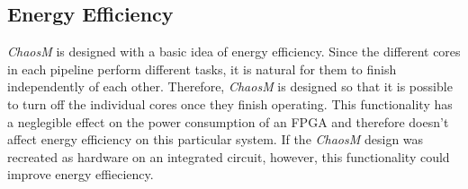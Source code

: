 \subsection{Energy Efficiency}

\textit{ChaosM} is designed with a basic idea of energy efficiency. Since the
different cores in each pipeline perform different tasks, it is natural for them
to finish independently of each other. Therefore, \textit{ChaosM} is designed so
that it is possible to turn off the individual cores once they finish operating.
This functionality has a neglegible effect on the power consumption of an FPGA
and therefore doesn't affect energy efficiency on this particular system. If the
\textit{ChaosM} design was recreated as hardware on an integrated circuit,
however, this functionality could improve energy effieciency.

